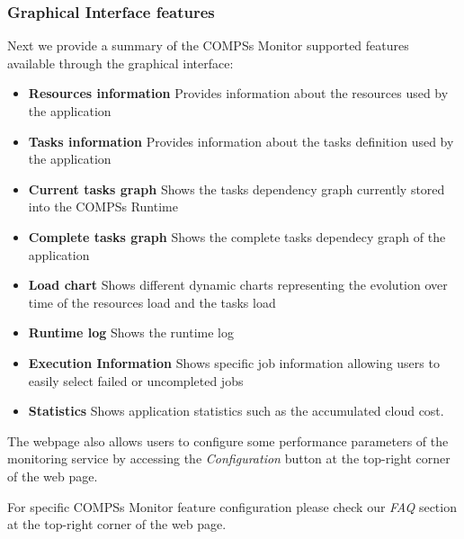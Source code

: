\subsubsection{Graphical Interface features}
Next we provide a summary of the COMPSs Monitor supported features available through the graphical interface:
\begin{itemize}
 \item \textbf{Resources information} \newline
	Provides information about the resources used by the application
 \item \textbf{Tasks information} \newline
	Provides information about the tasks definition used by the application
 \item \textbf{Current tasks graph} \newline
	Shows the tasks dependency graph currently stored into the COMPSs Runtime
 \item \textbf{Complete tasks graph} \newline
	Shows the complete tasks dependecy graph of the application
 \item \textbf{Load chart} \newline
	Shows different dynamic charts representing the evolution over time of the resources load and the tasks load
 \item \textbf{Runtime log} \newline
	Shows the runtime log
 \item \textbf{Execution Information} \newline
	Shows specific job information allowing users to easily select failed or uncompleted jobs
 \item \textbf{Statistics} \newline
	Shows application statistics such as the accumulated cloud cost. 
\end{itemize}


The webpage also allows users to configure some performance parameters of the monitoring service by accessing the 
\textit{Configuration} button at the top-right corner of the web page. 

For specific COMPSs Monitor feature configuration please check our \textit{FAQ} section at the top-right corner of the web page. 



